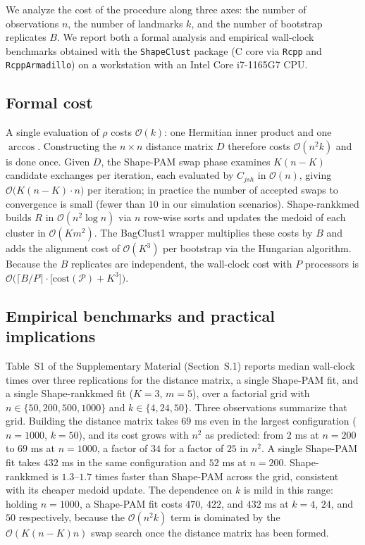 \documentclass[review,11pt,3p,authoryear]{elsarticle}
\newcommand{\bigOh}{\mathcal{O}}
\newcommand{\ShapeClust}{\texttt{ShapeClust}}
\begin{document}
We analyze the cost of the procedure along three axes: the number of
observations $n$, the number of landmarks $k$, and the number of
bootstrap replicates $B$. We report both a formal analysis and
empirical wall-clock benchmarks obtained with the \ShapeClust{}
package (C\raisebox{0.3ex}{\scriptsize++} core via \texttt{Rcpp}
and \texttt{RcppArmadillo}) on a workstation with an Intel Core
i7-1165G7 CPU.

\subsection{Formal cost}

A single evaluation of $\rho$ costs $\bigOh(k)$: one Hermitian inner
product and one $\arccos$. Constructing the $n\times n$ distance matrix
$D$ therefore costs $\bigOh(n^2 k)$ and is done once. Given $D$, the
Shape-PAM swap phase examines $K(n-K)$ candidate exchanges per
iteration, each evaluated by $C_{jsh}$ in $\bigOh(n)$, giving
$\bigOh\!\bigl(K(n-K)\cdot n\bigr)$ per iteration; in practice the
number of accepted swaps to convergence is small (fewer than $10$ in
our simulation scenarios). Shape-rankkmed builds $R$ in $\bigOh(n^2\log n)$
via $n$ row-wise sorts and updates the medoid of each cluster in
$\bigOh(K m^2)$. The BagClust1 wrapper multiplies these costs by $B$
and adds the alignment cost of $\bigOh(K^3)$ per bootstrap via the
Hungarian algorithm. Because the $B$ replicates are independent, the
wall-clock cost with $P$ processors is
$\bigOh\!\bigl(\lceil B/P\rceil\cdot\bigl[\text{cost}(\mathcal{P}) +
K^3\bigr]\bigr)$.

\subsection{Empirical benchmarks and practical implications}

Table~S1 of the Supplementary Material (Section~S.1) reports median wall-clock times
over three replications for the distance matrix, a single Shape-PAM
fit, and a single Shape-rankkmed fit ($K=3$, $m=5$), over a factorial
grid with $n\in\{50,200,500,1000\}$ and $k\in\{4,24,50\}$. Three
observations summarize that grid. Building the distance matrix takes
$69$ ms even in the largest configuration ($n=1000$, $k=50$), and its cost grows
with $n^2$ as predicted: from $2$ ms at $n=200$ to $69$ ms at
$n=1000$, a factor of $34$ for a factor of $25$ in $n^2$. A single
Shape-PAM fit takes $432$ ms in the same configuration and $52$ ms at $n=200$.
Shape-rankkmed is $1.3$--$1.7$ times faster than Shape-PAM across the
grid, consistent with its cheaper medoid update. The dependence on $k$
is mild in this range: holding $n=1000$, a Shape-PAM fit costs $470$,
$422$, and $432$ ms at $k=4$, $24$, and $50$ respectively, because the
$\bigOh(n^2 k)$ term is dominated by the $\bigOh(K(n-K)n)$ swap search
once the distance matrix has been formed.
\end{document}
